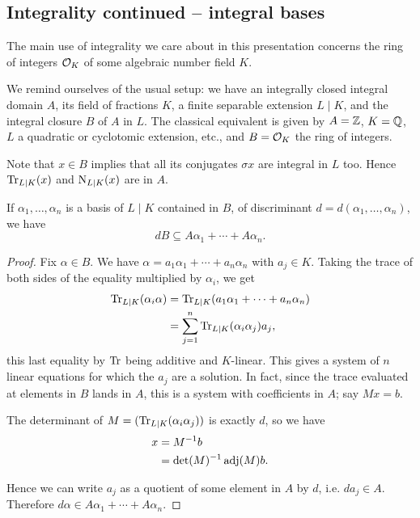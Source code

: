 \subsection{Integrality continued -- integral bases}


The main use of integrality we care about in this presentation concerns the ring of integers $\mathcal{O}_K$ of some algebraic number field $K$. 

We remind ourselves of the usual setup: we have an integrally closed integral domain $A$, its field of fractions $K$, a finite separable extension $L\mid K$, and the integral closure $B$ of $A$ in $L$. The classical equivalent is given by $A=\mathbb{Z}$, $K=\mathbb{Q}$, $L$ a quadratic or cyclotomic extension, etc., and $B=\mathcal{O}_K$ the ring of integers.

Note that $x\in B$ implies that all its conjugates $\sigma x$ are integral in $L$ too. Hence $\operatorname{Tr}_{L\mid K}(x)$ and $\operatorname{N}_{L\mid K}(x)$ are in $A$.

\begin{lem}
	If $\alpha_1,\dots,\alpha_n$ is a basis of $L\mid K$ contained in $B$, of discriminant $d=d(\alpha_1,\dots,\alpha_n)$, we have
	\[
		dB\subseteq A\alpha_1 + \cdots + A\alpha_n.
	\]
\end{lem}
\begin{proof}
	Fix $\alpha\in B$. We have $\alpha=a_1\alpha_1+\cdots+a_n\alpha_n$ with $a_j\in K$. Taking the trace of both sides of the equality multiplied by $\alpha_i$, we get
	\begin{align*}
		\operatorname{Tr}_{L\mid K}(\alpha_i \alpha) &= \operatorname{Tr}_{L\mid K}(a_1\alpha_1+\cdots+a_n\alpha_n)\\
			&= \sum_{j=1}^n \operatorname{Tr}_{L\mid K}(\alpha_i\alpha_j) a_j,
	\end{align*}
	this last equality by $\operatorname{Tr}$ being additive and $K$-linear. This gives a system of $n$ linear equations for which the $a_j$ are a solution. In fact, since the trace evaluated at elements in $B$ lands in $A$, this is a system with coefficients in $A$; say $Mx=b$.

	The determinant of $M=(\operatorname{Tr}_{L\mid K}(\alpha_i\alpha_j))$ is exactly $d$, so we have
	\begin{align*}
		x &= M^{-1} b\\
		  &= \det(M)^{-1}\operatorname{adj}(M)b.
	\end{align*}
	
	Hence we can write $a_j$ as a quotient of some element in $A$ by $d$, i.e. $da_j\in A$. Therefore $d\alpha\in A\alpha_1+\cdots+A\alpha_n$.
\end{proof}

